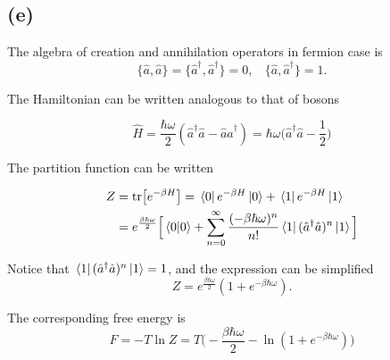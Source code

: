\documentclass[12pt]{article}
\begin{document}
\subsection*{(e)}

The algebra of creation and annihilation operators in fermion case is 
\begin{equation*}
    \{\hat{a},\hat{a}\}=\{\hat{a}^\dagger,\hat{a}^\dagger\}=0,\ \ \ \ 
    \{\hat{a},\hat{a}^\dagger\}=1.
\end{equation*}

The Hamiltonian can be written analogous to that of bosons

\begin{equation*}
    \hat{H}=\frac{\hbar\omega}{2}(\hat{a}^\dagger\hat{a}-\hat{a}
    \hat{a}^\dagger)=\hbar\omega\Big(\hat{a}^\dagger\hat{a}-\frac{1}{2}\Big)
\end{equation*}

The partition function can be written

\begin{equation*}
    \begin{split}
        Z&=\tr[e^{-\beta H}]=\bra*{0}e^{-\beta H}\ket*{0}+
        \bra*{1}e^{-\beta H}\ket*{1}\\
        &=e^{\frac{\beta\hbar\omega}{2}}\Big[\bra*{0}\ket*{0}+
        \sum_{n=0}^\infty\frac{(-\beta\hbar\omega)^n}{n!}\bra*{1}
        (\hat{a}^\dagger\hat{a})^n\ket*{1}\Big]
    \end{split}
\end{equation*}

Notice that $\bra*{1}(\hat{a}^\dagger\hat{a})^n\ket*{1}=1$, and the 
expression can be simplified
\begin{equation*}
    Z=e^{\frac{\beta\hbar\omega}{2}}(1+e^{-\beta\hbar\omega}).
\end{equation*}

The corresponding free energy is 
\begin{equation*}
    F=-T\ln Z=T\Big(-\frac{\beta\hbar\omega}{2}-\ln(1+e^{-\beta\hbar\omega})\Big)
\end{equation*}
\end{document}
